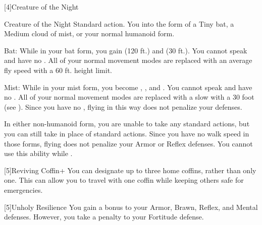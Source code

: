     [4]{Creature of the Night}
      \begin{magicalattuneability}{Creature of the Night}{}
        \abilityusagetime Standard action.
        \rankline
        You  into the form of a Tiny bat, a Medium cloud of mist, or your normal humanoid form.
        \begin{raggeditemize}
          \item Bat: While in your bat form, you gain  (120 ft.) and  (30 ft.).
            You cannot speak and have no .
            All of your normal movement modes are replaced with an average fly speed with a 60 ft. height limit.
          \item Mist: While in your mist form, you become , , and .
            You cannot speak and have no .
            All of your normal movement modes are replaced with a slow  with a 30 foot  (see ).
            Since you have no , flying in this way does not penalize your defenses.
        \end{raggeditemize}

        In either non-humanoid form, you are unable to take any standard actions, but you can still take  in place of standard actions.
        Since you have no walk speed in those forms, flying does not penalize your Armor or Reflex defenses.
        You cannot use this ability while \paralyzed.
      \end{magicalattuneability}

    [5]{Reviving Coffin+} You can designate up to three home coffins, rather than only one.
      This can allow you to travel with one coffin while keeping others safe for emergencies.

    [5]{Unholy Resilience} You gain a  bonus to your Armor, Brawn, Reflex, and Mental defenses.
      However, you take a  penalty to your Fortitude defense.

